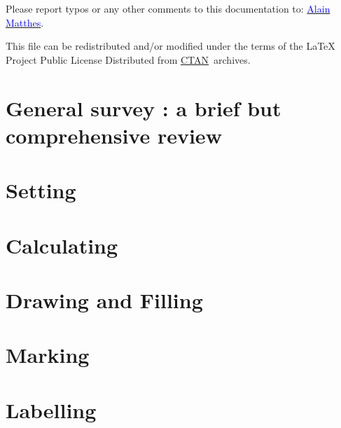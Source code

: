 \documentclass[DIV         = 14,
               fontsize    = 10,
               index       = totoc,
               twoside,
               cadre,
               headings    = small,
               ]{tkz-doc}
\begin{document}
\vfill
Please report typos or any other comments to this documentation to: \href{mailto:al.ma@mac.com}{\textcolor{blue}{Alain Matthes}}.

This file can be redistributed and/or modified under the terms of the \LaTeX{} 
Project Public License Distributed from \href{http://www.ctan.org/}{CTAN}\  archives.

\clearpage
\tableofcontents
\clearpage
\newpage

\part{General survey : a brief but comprehensive review}






\part{Setting}


\part{Calculating}












\part{Drawing and Filling}




\part{Marking}


\part{Labelling}

\end{document}
